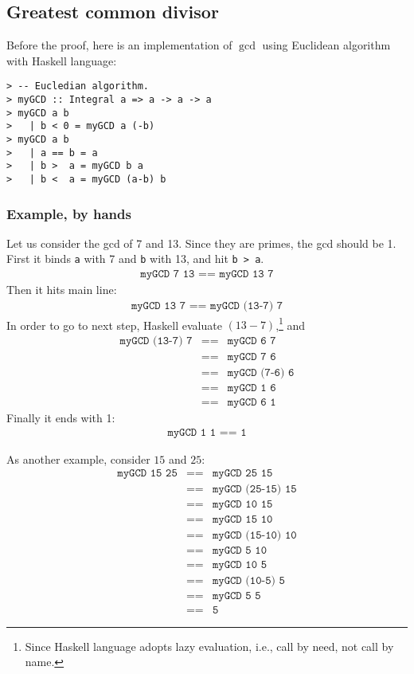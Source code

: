 \documentclass[11pt]{book}
\begin{document}
\subsection{Greatest common divisor}
\label{gcdDefinition}
Before the proof, here is an implementation of $\gcd$ using Euclidean algorithm with Haskell language:

\begin{verbatim}
> -- Eucledian algorithm.
> myGCD :: Integral a => a -> a -> a
> myGCD a b
>   | b < 0 = myGCD a (-b)
> myGCD a b
>   | a == b = a
>   | b >  a = myGCD b a
>   | b <  a = myGCD (a-b) b
\end{verbatim}

\subsubsection{Example, by hands}
Let us consider the gcd of 7 and 13.
Since they are primes, the gcd should be 1.
First it binds \texttt{a} with 7 and \texttt{b} with 13, and hit \texttt{b > a}.
\begin{eqnarray}
\texttt{myGCD 7 13 == myGCD 13 7}
\end{eqnarray}
Then it hits main line:
\begin{eqnarray}
\texttt{myGCD 13 7 == myGCD (13-7) 7}
\end{eqnarray}
In order to go to next step, Haskell evaluate $(13-7)$,\footnote{
Since Haskell language adopts lazy evaluation, i.e., call by need, not call by name.
}
and
\begin{eqnarray}
\texttt{myGCD (13-7) 7} &\texttt{==}& \texttt{myGCD 6 7} \\
&\texttt{==}& \texttt{myGCD 7 6} \\
&\texttt{==}& \texttt{myGCD (7-6) 6} \\
&\texttt{==}& \texttt{myGCD 1 6} \\
&\texttt{==}& \texttt{myGCD 6 1}
\end{eqnarray}
Finally it ends with 1:
\begin{eqnarray}
\texttt{myGCD 1 1 == 1} 
\end{eqnarray}

As another example, consider $15$ and $25$:
\begin{eqnarray}
\texttt{myGCD 15 25} &\texttt{==}& \texttt{myGCD 25 15}\\
&\texttt{==}& \texttt{myGCD (25-15) 15}\\
&\texttt{==}& \texttt{myGCD 10 15}\\
&\texttt{==}& \texttt{myGCD 15 10}\\
&\texttt{==}& \texttt{myGCD (15-10) 10}\\
&\texttt{==}& \texttt{myGCD 5 10}\\
&\texttt{==}& \texttt{myGCD 10 5}\\
&\texttt{==}& \texttt{myGCD (10-5) 5}\\
&\texttt{==}& \texttt{myGCD 5 5}\\
&\texttt{==}& \texttt{5}
\end{eqnarray}
\end{document}
